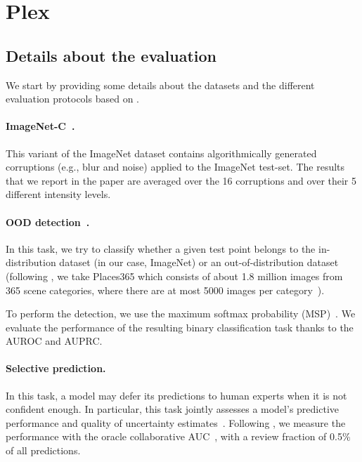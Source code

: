 \section{Plex}
\label{app:plex}

\subsection{Details about the evaluation}

We start by providing some details about the datasets and the different evaluation protocols based on \citet{djolonga2020robustness}.

\paragraph{ImageNet-C~\citep{hendrycks2019benchmarking}.} This variant of the ImageNet dataset contains algorithmically generated corruptions (e.g., blur and noise) applied to the ImageNet test-set. The results that we report in the paper are averaged over the 16 corruptions and over their 5 different intensity levels.

\paragraph{OOD detection~\citep{hendrycks2019scaling,fort2021exploring}.} In this task, we try to classify whether a given test point belongs to the in-distribution dataset (in our case, ImageNet) or an out-of-distribution dataset (following \citet{hendrycks2019scaling, tran2022plex}, we take Places365 which consists of about 1.8 million images from 365 scene categories, where there are at most 5000 images per category~\citep{zhou2017places}).

To perform the detection, we use the maximum softmax probability (MSP)~\citep{hendrycks2019scaling, tran2022plex}. We evaluate the performance of the resulting binary classification task thanks to the AUROC and AUPRC.

\paragraph{Selective prediction.}
In this task, a model may defer its predictions to human experts when it is not confident enough.
In particular, this task jointly assesses a model’s predictive performance and quality of
uncertainty estimates~\citep{el2010foundations}. 
Following \citet{tran2022plex}, we measure the performance with the oracle collaborative AUC~\citep{kivlichan2021measuring}, with a review fraction of 0.5\% of all predictions.

